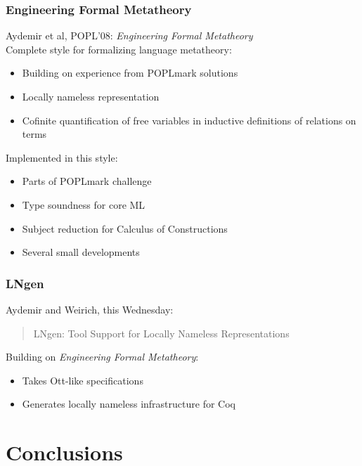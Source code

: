 \documentclass[notheorems]{beamer}
\begin{document}
\begin{frame}

  \frametitle{Engineering Formal Metatheory}

  Aydemir et al, POPL'08: {\em Engineering Formal Metatheory}\\[2em]

  Complete style for formalizing language metatheory:
  \begin{itemize}
    \item Building on experience from POPLmark solutions
    \item Locally nameless representation
    \item Cofinite quantification of free variables in inductive definitions of relations on terms\\[2em]
  \end{itemize}

  Implemented in this style:
  \begin{itemize}
    \item Parts of POPLmark challenge
    \item Type soundness for core ML
    \item Subject reduction for Calculus of Constructions
    \item Several small developments
  \end{itemize}

\end{frame}


\begin{frame}

  \frametitle{LNgen}

  Aydemir and Weirich, this Wednesday:
  \begin{quote}
    LNgen: Tool Support for Locally Nameless Representations\\[2em]
  \end{quote}

  Building on {\em Engineering Formal Metatheory}:
  \begin{itemize}
    \item Takes Ott-like specifications
    \item Generates locally nameless infrastructure for Coq
  \end{itemize}

\end{frame}


\section{Conclusions}
\end{document}
